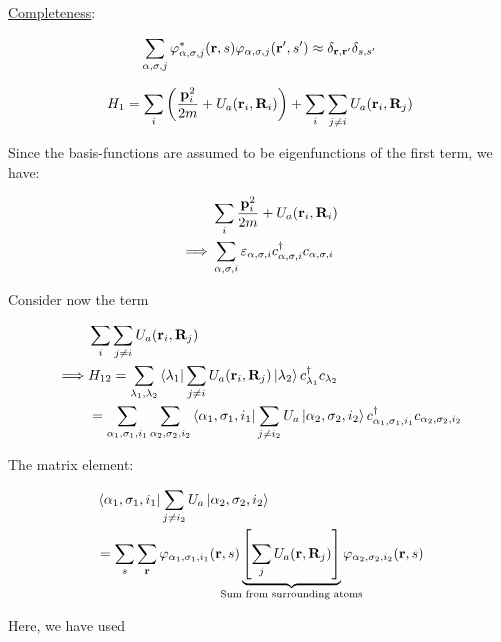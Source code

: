 \noindent \uline{Completeness}:

\begin{align*}
\sum_{\alpha, \sigma, j} \varphi^*_{\alpha, \sigma,j}(\vb{r},s)\varphi_{\alpha, \sigma,j}(\vb{r}',s') \approx \delta_{\vb{r},\vb{r}'} \delta_{s,s'} 
\end{align*}

\begin{align*}
	H_1 = \sum_i \left( \frac{\vb{p}_i^2}{2m}+ U_a (\vb{r}_i, \vb{R}_i) \right) + \sum_i \sum_{j \neq i} U_a ( \vb{r}_i, \vb{R}_j)
\end{align*}

\noindent Since the basis-functions are assumed to be eigenfunctions of the first term, we have:

\begin{align*}
	&\sum_i  \frac{\vb{p}_i^2}{2m}+ U_a (\vb{r}_i, \vb{R}_i)\\
	\implies & \sum_{\alpha, \sigma, i} \varepsilon_{\alpha, \sigma, i} c^{\dagger}_{\alpha, \sigma, i} c_{\alpha, \sigma, i}
\end{align*}

\noindent Consider now the term

\begin{align*}
	& \sum_i \sum_{j \neq i} U_a ( \vb{r}_i, \vb{R}_j)\\
	\implies & H_{12} = \sum_{{\lambda_{1}}, {\lambda_{2}}} \bra{\lambda_{1}}  \sum_{j \neq i} U_a ( \vb{r}_i, \vb{R}_j) \ket{\lambda_{2}} c^{\dagger}_{ \lambda_1} c_{\lambda_{2}}\\
	&= \sum_{\alpha_1, \sigma_1, i_1} \sum_{\alpha_2, \sigma_2, i_2} \bra{\alpha_1, \sigma_1, i_1} \sum_{j \neq i_2} U_a \ket{\alpha_2, \sigma_2, i_2} c^{\dagger}_{\alpha_1, \sigma_1, i_1} c_{\alpha_2, \sigma_2, i_2}
\end{align*}

The matrix element: 

\begin{align*}
	&\bra{\alpha_1, \sigma_1, i_1} \sum_{j \neq i_2} U_a \ket{\alpha_2, \sigma_2, i_2}\\
	&= \sum_s \sum_{\vb{r}} \varphi_{\alpha_1, \sigma_1, i_1} (\vb{r},s) \underbrace{\left[\sum_j U_a (\vb{r},\vb{R}_j) \right] }_{\mathclap{\text{Sum from surrounding atoms}}}  \varphi_{\alpha_2, \sigma_2, i_2}(\vb{r},s)
\end{align*}

Here, we have used

